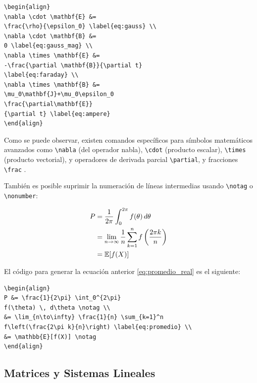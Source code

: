 \begin{verbatim}
\begin{align}
\nabla \cdot \mathbf{E} &= 
\frac{\rho}{\epsilon_0} \label{eq:gauss} \\
\nabla \cdot \mathbf{B} &= 
0 \label{eq:gauss_mag} \\
\nabla \times \mathbf{E} &= 
-\frac{\partial \mathbf{B}}{\partial t} 
\label{eq:faraday} \\
\nabla \times \mathbf{B} &= 
\mu_0\mathbf{J}+\mu_0\epsilon_0
\frac{\partial\mathbf{E}}
{\partial t} \label{eq:ampere}
\end{align}
\end{verbatim}

Como se puede observar, existen comandos específicos para símbolos matemáticos avanzados como \texttt{\textbackslash nabla} (del operador nabla), \texttt{\textbackslash cdot} (producto escalar), \texttt{\textbackslash times} (producto vectorial), y operadores de derivada parcial \texttt{\textbackslash partial}, y fracciones \texttt{\textbackslash frac} \cite{amsmath_manual}.

También es posible suprimir la numeración de líneas intermedias usando \texttt{\textbackslash notag} o \texttt{\textbackslash nonumber}:

\begin{align}
P &= \frac{1}{2\pi} \int_0^{2\pi} f(\theta) \, d\theta \notag \\
&= \lim_{n\to\infty} \frac{1}{n} \sum_{k=1}^n f\left(\frac{2\pi k}{n}\right) \label{eq:promedio_real} \\
&= \mathbb{E}[f(X)] \notag
\end{align}

El código para generar la ecuación anterior \eqref{eq:promedio_real} es el siguiente:

\begin{verbatim}
\begin{align}
P &= \frac{1}{2\pi} \int_0^{2\pi} 
f(\theta) \, d\theta \notag \\
&= \lim_{n\to\infty} \frac{1}{n} \sum_{k=1}^n 
f\left(\frac{2\pi k}{n}\right) \label{eq:promedio} \\
&= \mathbb{E}[f(X)] \notag
\end{align}
\end{verbatim}


\subsection{Matrices y Sistemas Lineales}

